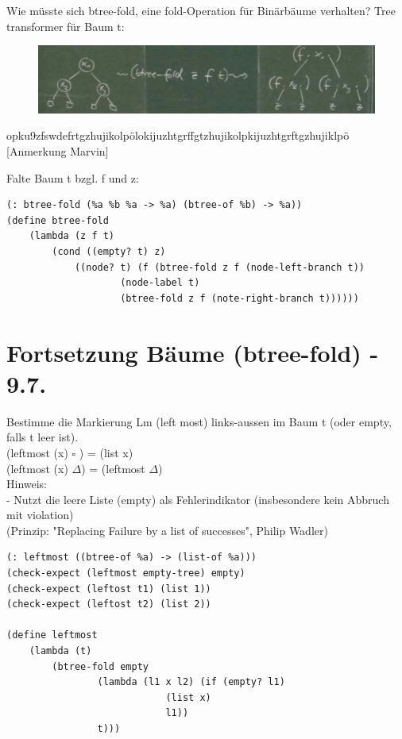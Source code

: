 \documentclass[a4paper, 20pt, openany]{book}
\begin{document}
Wie müsste sich btree-fold, eine fold-Operation für Binärbäume verhalten? Tree transformer für Baum t:

\begin{figure}[ht]
	\centering
  \includegraphics[width=1\textwidth, angle=0]{btree-fold.jpg}
	\label{fig1}
\end{figure}

opku9zfswdefrtgzhujikolpölokijuzhtgrffgtzhujikolpkijuzhtgrftgzhujiklpö [Anmerkung Marvin]

Falte Baum t bzgl. f und z:\\
\begin{lstlisting}
(: btree-fold (%a %b %a -> %a) (btree-of %b) -> %a))
(define btree-fold
	(lambda (z f t)
		(cond ((empty? t) z)
			((node? t) (f (btree-fold z f (node-left-branch t))
					(node-label t)
					(btree-fold z f (note-right-branch t))))))
\end{lstlisting}


\chapter{Fortsetzung Bäume (btree-fold) - 9.7.}
Bestimme die Markierung Lm (left most) links-aussen im Baum t (oder empty, falls t leer ist).\\

(leftmost (x) $\square$ ) = (list x)\\
(leftmost (x) $\Delta$) = (leftmost $\Delta$)\\
Hinweis:\\
- Nutzt die leere Liste (empty) als Fehlerindikator (insbesondere kein Abbruch mit violation)\\
(Prinzip: "Replacing Failure by a list of successes", Philip Wadler)\\
\begin{lstlisting}
(: leftmost ((btree-of %a) -> (list-of %a)))
(check-expect (leftmost empty-tree) empty)
(check-expect (leftost t1) (list 1))
(check-expect (leftost t2) (list 2))

(define leftmost
	(lambda (t)
		(btree-fold empty
				(lambda (l1 x l2) (if (empty? l1)
							(list x)
							l1))
				t)))
\end{lstlisting}
\end{document}
